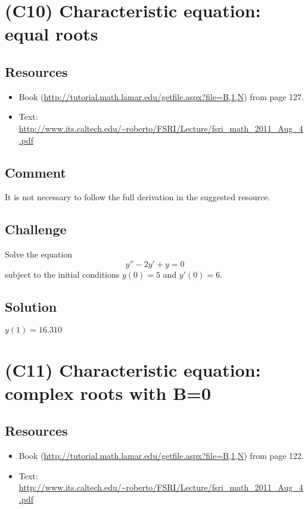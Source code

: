\section{(C10) Characteristic equation: equal roots}

\subsection*{Resources}
\begin{itemize}
    \item Book (\url{http://tutorial.math.lamar.edu/getfile.aspx?file=B,1,N}) from page 127.
    \item Text: \url{http://www.its.caltech.edu/~roberto/FSRI/Lecture/fsri_math_2011_Aug_4.pdf}
\end{itemize}

\subsection*{Comment}
It is not necessary to follow the full derivation in the suggested resource.

\subsection*{Challenge}
Solve the equation
\begin{equation}
    y'' - 2y' + y = 0
\end{equation}
subject to the initial conditions $y(0)=5$ and $y'(0)=6$.

\subsection*{Solution}
$y(1)=16.310$



\newpage
\section{(C11) Characteristic equation: complex roots with B=0}

\subsection*{Resources}
\begin{itemize}
    \item Book (\url{http://tutorial.math.lamar.edu/getfile.aspx?file=B,1,N}) from page 122.
    \item Text: \url{http://www.its.caltech.edu/~roberto/FSRI/Lecture/fsri_math_2011_Aug_4.pdf}
\end{itemize}

